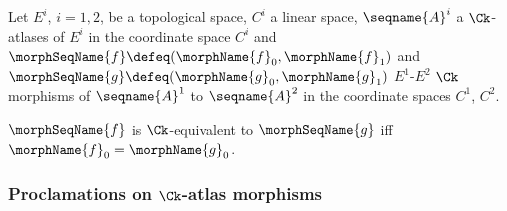 \documentclass{article}
\begin{document}
\begin{definition}
\label{def:Ck-ATLmorphequiv}
Let $E^i$, $i=1,2$, be a topological space, $C^i$ a linear space,
$\seqname{A}^i$ a $\Ck$-atlases of $E^i$ in the coordinate space $C^i$ and
$\morphSeqName{f} \defeq (\morphName{f}_0, \morphName{f}_1)$ and
$\morphSeqName{g} \defeq (\morphName{g}_0, \morphName{g}_1)$ $E^1$-$E^2$
$\Ck$ morphisms of $\seqname{A}^1$ to $\seqname{A}^2$ in the
coordinate spaces $C^1$, $C^2$.

$\morphSeqName{f}$ is $\Ck$-equivalent to $\morphSeqName{g}$ iff
$\morphName{f}_0 = \morphName{g}_0$.
\end{definition}

\subsubsection{Proclamations on \ensuremath{\Ck}-atlas morphisms}
\end{document}
